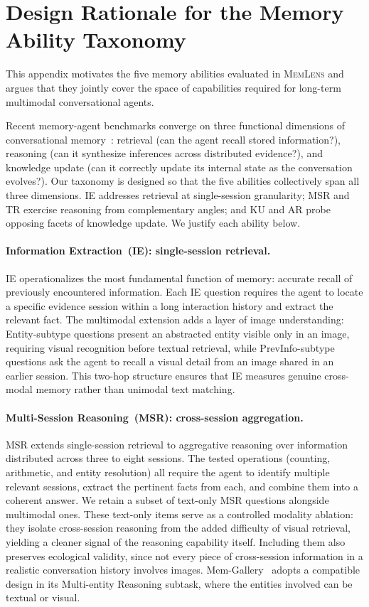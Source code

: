 \documentclass{article}
\newcommand{\bench}{\textsc{MemLens}}
\begin{document}
\section{Design Rationale for the Memory Ability Taxonomy}
\label{app:taxonomy_rationale}

This appendix motivates the five memory abilities evaluated in \bench{} and argues that they jointly cover the space of capabilities required for long-term multimodal conversational agents.

Recent memory-agent benchmarks converge on three functional dimensions of conversational memory~\cite{memgallery,wu2025longmemevalbenchmarkingchatassistants}: retrieval (can the agent recall stored information?), reasoning (can it synthesize inferences across distributed evidence?), and knowledge update (can it correctly update its internal state as the conversation evolves?). Our taxonomy is designed so that the five abilities collectively span all three dimensions. IE addresses retrieval at single-session granularity; MSR and TR exercise reasoning from complementary angles; and KU and AR probe opposing facets of knowledge update. We justify each ability below.

\paragraph{Information Extraction~(IE): single-session retrieval.}
IE operationalizes the most fundamental function of memory: accurate recall of previously encountered information. Each IE question requires the agent to locate a specific evidence session within a long interaction history and extract the relevant fact. The multimodal extension adds a layer of image understanding: Entity-subtype questions present an abstracted entity visible only in an image, requiring visual recognition before textual retrieval, while PrevInfo-subtype questions ask the agent to recall a visual detail from an image shared in an earlier session. This two-hop structure ensures that IE measures genuine cross-modal memory rather than unimodal text matching.

\paragraph{Multi-Session Reasoning~(MSR): cross-session aggregation.}
MSR extends single-session retrieval to aggregative reasoning over information distributed across three to eight sessions. The tested operations (counting, arithmetic, and entity resolution) all require the agent to identify multiple relevant sessions, extract the pertinent facts from each, and combine them into a coherent answer. We retain a subset of text-only MSR questions alongside multimodal ones. These text-only items serve as a controlled modality ablation: they isolate cross-session reasoning from the added difficulty of visual retrieval, yielding a cleaner signal of the reasoning capability itself. Including them also preserves ecological validity, since not every piece of cross-session information in a realistic conversation history involves images. Mem-Gallery~\cite{memgallery} adopts a compatible design in its Multi-entity Reasoning subtask, where the entities involved can be textual or visual.
\end{document}

